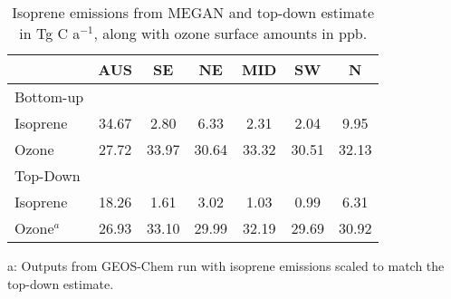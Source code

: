   
  \begin{table}\begin{threeparttable}
    \caption{Isoprene emissions from MEGAN and top-down estimate in Tg C a$^{-1}$, along with ozone surface amounts in ppb.}
    \begin{tabular}{ l c c c c c c } 
      \toprule
                     & AUS & SE & NE & MID & SW & N \\
      \midrule
      Bottom-up      & & & & & & \\
      Isoprene       & 34.67 &  2.80 &  6.33 &  2.31 &  2.04 &  9.95 \\
      Ozone          & 27.72 & 33.97 & 30.64 & 33.32 & 30.51 & 32.13 \\
      \midrule
      Top-Down       & & & & & & \\
      Isoprene       & 18.26 &  1.61 &  3.02 &  1.03 &  0.99 &  6.31 \\
      Ozone$^a$      & 26.93 & 33.10 & 29.99 & 32.19 & 29.69 & 30.92 \\
      \bottomrule
    \end{tabular}
    \begin{tablenotes}
      \small
      \item a: Outputs from GEOS-Chem run with isoprene emissions scaled to match the top-down estimate.
    \end{tablenotes}
    \label{Conclusions:ozone:tab_emissions_vs_ozone}
  \end{threeparttable}\end{table}
  
  
  
  
